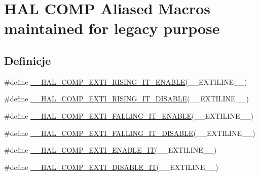 \hypertarget{group___h_a_l___c_o_m_p___aliased___macros}{}\section{H\+AL C\+O\+MP Aliased Macros maintained for legacy purpose}
\label{group___h_a_l___c_o_m_p___aliased___macros}
\subsection*{Definicje}
\begin{DoxyCompactItemize}
\item 
\#define \hyperlink{group___h_a_l___c_o_m_p___aliased___macros_ga3b6842cbf1a844d87f0ebb50b5322ae9}{\+\_\+\+\_\+\+H\+A\+L\+\_\+\+C\+O\+M\+P\+\_\+\+E\+X\+T\+I\+\_\+\+R\+I\+S\+I\+N\+G\+\_\+\+I\+T\+\_\+\+E\+N\+A\+B\+LE}(\+\_\+\+\_\+\+E\+X\+T\+I\+L\+I\+N\+E\+\_\+\+\_\+)
\item 
\#define \hyperlink{group___h_a_l___c_o_m_p___aliased___macros_ga234c3825b14ee41458a8a58430a1f448}{\+\_\+\+\_\+\+H\+A\+L\+\_\+\+C\+O\+M\+P\+\_\+\+E\+X\+T\+I\+\_\+\+R\+I\+S\+I\+N\+G\+\_\+\+I\+T\+\_\+\+D\+I\+S\+A\+B\+LE}(\+\_\+\+\_\+\+E\+X\+T\+I\+L\+I\+N\+E\+\_\+\+\_\+)
\item 
\#define \hyperlink{group___h_a_l___c_o_m_p___aliased___macros_ga1803e81c3920a4c18f752124e15ee6f7}{\+\_\+\+\_\+\+H\+A\+L\+\_\+\+C\+O\+M\+P\+\_\+\+E\+X\+T\+I\+\_\+\+F\+A\+L\+L\+I\+N\+G\+\_\+\+I\+T\+\_\+\+E\+N\+A\+B\+LE}(\+\_\+\+\_\+\+E\+X\+T\+I\+L\+I\+N\+E\+\_\+\+\_\+)
\item 
\#define \hyperlink{group___h_a_l___c_o_m_p___aliased___macros_ga28220cc53eb0155d2f6d3197a464092b}{\+\_\+\+\_\+\+H\+A\+L\+\_\+\+C\+O\+M\+P\+\_\+\+E\+X\+T\+I\+\_\+\+F\+A\+L\+L\+I\+N\+G\+\_\+\+I\+T\+\_\+\+D\+I\+S\+A\+B\+LE}(\+\_\+\+\_\+\+E\+X\+T\+I\+L\+I\+N\+E\+\_\+\+\_\+)
\item 
\#define \hyperlink{group___h_a_l___c_o_m_p___aliased___macros_ga582415dabdca3b746b4713f686b6ddf0}{\+\_\+\+\_\+\+H\+A\+L\+\_\+\+C\+O\+M\+P\+\_\+\+E\+X\+T\+I\+\_\+\+E\+N\+A\+B\+L\+E\+\_\+\+IT}(\+\_\+\+\_\+\+E\+X\+T\+I\+L\+I\+N\+E\+\_\+\+\_\+)
\item 
\#define \hyperlink{group___h_a_l___c_o_m_p___aliased___macros_ga50d9fdcb3ccb16b52d567bb3a5821d61}{\+\_\+\+\_\+\+H\+A\+L\+\_\+\+C\+O\+M\+P\+\_\+\+E\+X\+T\+I\+\_\+\+D\+I\+S\+A\+B\+L\+E\+\_\+\+IT}(\+\_\+\+\_\+\+E\+X\+T\+I\+L\+I\+N\+E\+\_\+\+\_\+)
\item 

\end{DoxyCompactItemize}
